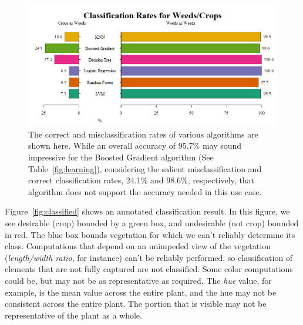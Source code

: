 \documentclass[letterpaper]{article}
\begin{document}
{{\begin{figure}[h]
	\centering
	\includegraphics[width=0.7\linewidth]{./figures/classification-rates.png}
	\caption[Misclassification rates of various algorithms]{The correct and misclassification rates of various algorithms are shown here. While an overall accuracy of 95.7\% may sound impressive for the Boosted Gradient algorithm (See Table~\ref{fig:learning}), considering the salient misclassification and correct classification rates, 24.1\% and 98.6\%, respectively, that algorithm does not support the accuracy needed in this use case.}
	\label{fig:classification-rates}
\end{figure}

Figure~\ref{fig:classified} shows an annotated classification result. In this figure, we see desirable (crop) bounded by a green box, and undesirable (not crop) bounded in red. The blue box bounds vegetation for which we can't reliably determine its class. Computations that depend on an unimpeded view of the vegetation ({\it length/width ratio}, for instance) can't be reliably performed, so classification of elements that are not fully captured are not classified. Some color computations could be, but may not be as representative as required. The {\it hue} value, for example, is the mean value across the entire plant, and the hue may not be consistent across the entire plant. The portion that is visible may not be representative of the plant as a whole.

}}
\end{document}
